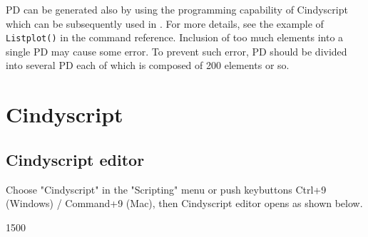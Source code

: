 \documentclass[papersize,a4paper,12pt]{article}
\begin{document}
PD can be generated also 
by using the programming capability of Cindyscript 
which can be subsequently used in \ketcindy .  
For more details, 
see the example of \verb|Listplot()| 
in the command reference. 
Inclusion of too much elements into a single PD 
may cause some error. 
To prevent such error, 
PD should be divided into several PD 
each of which is composed of 200 elements or so. 


\newpage

\section{Cindyscript}

\subsection{Cindyscript editor}

Choose "Cindyscript" in the "Scripting" menu 
or push keybuttons Ctrl+9 (Windows) / Command+9 (Mac), 
then Cindyscript editor opens as shown below. 

\begin{layer}{150}{0}
\end{layer}

\vspace{105mm}
\end{document}
